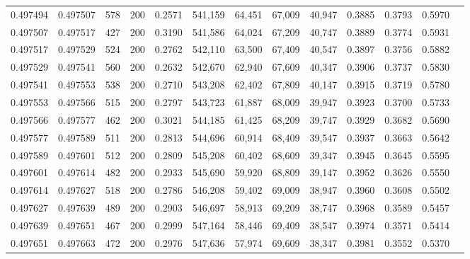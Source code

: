 \begin{tabular}{rrrrrrrrrrrrr}
0.497494 & 0.497507 &    578 & 200 &                                     0.2571 & 541,159 &  64,451 &  67,009 &  40,947 & 0.3885 & 0.3793 & 0.5970 \\
0.497507 & 0.497517 &    427 & 200 &                                     0.3190 & 541,586 &  64,024 &  67,209 &  40,747 & 0.3889 & 0.3774 & 0.5931 \\
0.497517 & 0.497529 &    524 & 200 &                                     0.2762 & 542,110 &  63,500 &  67,409 &  40,547 & 0.3897 & 0.3756 & 0.5882 \\
0.497529 & 0.497541 &    560 & 200 &                                     0.2632 & 542,670 &  62,940 &  67,609 &  40,347 & 0.3906 & 0.3737 & 0.5830 \\
0.497541 & 0.497553 &    538 & 200 &                                     0.2710 & 543,208 &  62,402 &  67,809 &  40,147 & 0.3915 & 0.3719 & 0.5780 \\
0.497553 & 0.497566 &    515 & 200 &                                     0.2797 & 543,723 &  61,887 &  68,009 &  39,947 & 0.3923 & 0.3700 & 0.5733 \\
0.497566 & 0.497577 &    462 & 200 &                                     0.3021 & 544,185 &  61,425 &  68,209 &  39,747 & 0.3929 & 0.3682 & 0.5690 \\
0.497577 & 0.497589 &    511 & 200 &                                     0.2813 & 544,696 &  60,914 &  68,409 &  39,547 & 0.3937 & 0.3663 & 0.5642 \\
0.497589 & 0.497601 &    512 & 200 &                                     0.2809 & 545,208 &  60,402 &  68,609 &  39,347 & 0.3945 & 0.3645 & 0.5595 \\
0.497601 & 0.497614 &    482 & 200 &                                     0.2933 & 545,690 &  59,920 &  68,809 &  39,147 & 0.3952 & 0.3626 & 0.5550 \\
0.497614 & 0.497627 &    518 & 200 &                                     0.2786 & 546,208 &  59,402 &  69,009 &  38,947 & 0.3960 & 0.3608 & 0.5502 \\
0.497627 & 0.497639 &    489 & 200 &                                     0.2903 & 546,697 &  58,913 &  69,209 &  38,747 & 0.3968 & 0.3589 & 0.5457 \\
0.497639 & 0.497651 &    467 & 200 &                                     0.2999 & 547,164 &  58,446 &  69,409 &  38,547 & 0.3974 & 0.3571 & 0.5414 \\
0.497651 & 0.497663 &    472 & 200 &                                     0.2976 & 547,636 &  57,974 &  69,609 &  38,347 & 0.3981 & 0.3552 & 0.5370 \\

\end{tabular}
